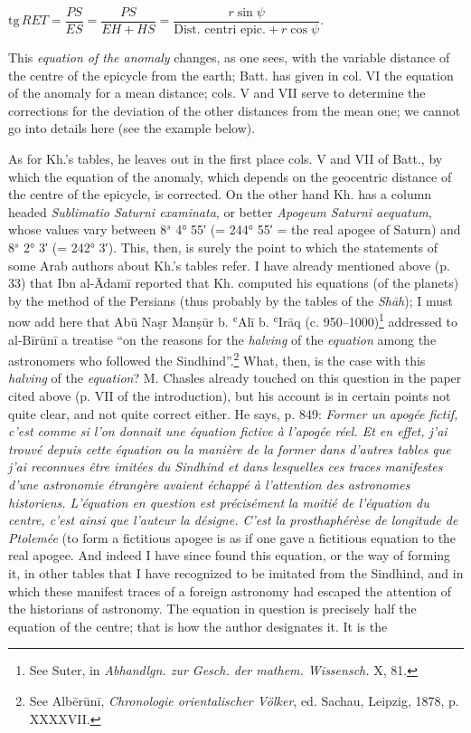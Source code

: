 \documentclass[11pt]{article}
\newcommand{\Pg}[1]{\marginpar{\footnotesize\color{gray}#1}}
\begin{document}
\par\begin{center}\Pg{49}$\mathrm{tg}\,RET = \dfrac{PS}{ES} = \dfrac{PS}{EH+HS} = \dfrac{r\sin\psi}{\text{Dist. centri epic.}+r\cos\psi}$.\end{center}
\par This \emph{equation of the anomaly} changes, as one sees, with the variable distance of the centre of the epicycle from the earth; Batt. has given in col. VI the equation of the anomaly for a mean distance; cols. V and VII serve to determine the corrections for the deviation of the other distances from the mean one; we cannot go into details here (see the example below).\par
\par As for Kh.'s tables, he leaves out in the first place cols. V and VII of Batt., by which the equation of the anomaly, which depends on the geocentric distance of the centre of the epicycle, is corrected. On the other hand Kh. has a column headed \emph{Sublimatio Saturni examinata}, or better \emph{Apogeum Saturni aequatum}, whose values vary between 8$^{s}$ 4° 55′ (= 244° 55′ = the real apogee of Saturn) and 8$^{s}$ 2° 3′ (= 242° 3′). This, then, is surely the point to which the statements of some Arab authors about Kh.'s tables refer. I have already mentioned above (p. 33) that Ibn al-Ādamī reported that Kh. computed his equations (of the planets) by the method of the Persians (thus probably by the tables of the \emph{Shāh}); I must now add here that Abū Naṣr Manṣūr b. ʿAlī b. ʿIrāq (c. 950–1000)\footnote{See Suter, in \emph{Abhandlgn. zur Gesch. der mathem. Wissensch.} X, 81.} addressed to al-Bīrūnī a treatise “on the reasons for the \emph{halving} of the \emph{equation} among the astronomers who followed the Sindhind”.\footnote{See Albērūnī, \emph{Chronologie orientalischer Völker}, ed. Sachau, Leipzig, 1878, p. XXXXVII.} What, then, is the case with this \emph{halving} of the \emph{equation}? M. Chasles already touched on this question in the paper cited above (p. VII of the introduction), but his account is in certain points not quite clear, and not quite correct either. He says, p. 849: \emph{Former un apogée fictif, c’est comme si l’on donnait une équation fictive à l’apogée réel. Et en effet, j’ai trouvé depuis cette équation ou la manière de la former dans d’autres tables que j’ai reconnues être imitées du Sindhind et dans lesquelles ces traces manifestes d’une astronomie étrangère avaient échappé à l’attention des astronomes historiens. L’équation en question est précisément} \emph{la moitié de l’équation du centre, c’est ainsi que l’auteur la désigne. C’est la prosthaphérèse de longitude de Ptolemée} (to form a fictitious apogee is as if one gave a fictitious equation to the real apogee. And indeed I have since found this equation, or the way of forming it, in other tables that I have recognized to be imitated from the Sindhind, and in which these manifest traces of a foreign astronomy had escaped the attention of the historians of astronomy. The equation in question is precisely half the equation of the centre; that is how the author designates it. It is the 
\end{document}
